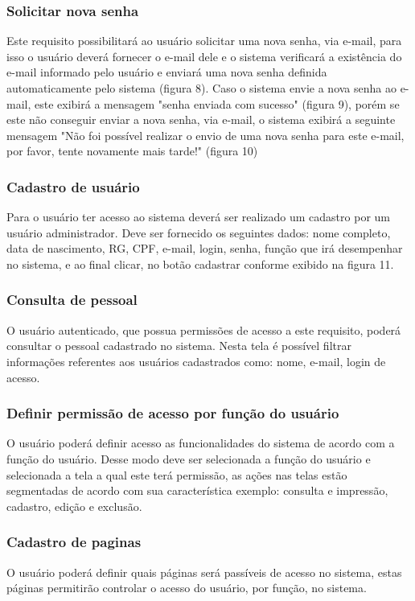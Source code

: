 \documentclass{acm_proc_article-sp}
\begin{document}
\subsubsection{Solicitar nova senha}
Este requisito possibilitará ao usuário solicitar uma nova senha, via e-mail, para isso o usuário deverá fornecer o e-mail dele e o sistema verificará a existência do e-mail informado pelo usuário e enviará uma nova senha definida automaticamente pelo sistema (figura 8). Caso o sistema envie a nova senha ao e-mail, este exibirá a mensagem "senha enviada com sucesso" (figura 9), porém se este não conseguir enviar a nova senha, via e-mail, o sistema exibirá a seguinte mensagem "Não foi possível realizar o envio de uma nova senha para este e-mail, por favor, tente novamente mais tarde!" (figura 10)

\subsubsection{Cadastro de usuário}
Para o usuário ter acesso ao sistema deverá ser realizado um cadastro por um usuário administrador. Deve ser fornecido os seguintes dados: nome completo, data de nascimento, RG, CPF, e-mail, login, senha, função que irá desempenhar no sistema, e ao final clicar, no botão cadastrar conforme exibido na figura 11.

\subsubsection{Consulta de pessoal}
O usuário autenticado, que possua permissões de acesso a este requisito, poderá consultar o pessoal cadastrado no sistema. Nesta tela é possível filtrar informações referentes aos usuários cadastrados como: nome, e-mail, login de acesso.   

\subsubsection{Definir permissão de acesso por função do usuário}
O usuário poderá definir acesso as funcionalidades do sistema de acordo com a função do usuário. Desse modo deve ser selecionada a função do usuário e selecionada a tela a qual este terá permissão, as ações nas telas estão segmentadas de acordo com sua característica exemplo: consulta e impressão, cadastro, edição e exclusão. 

\subsubsection{Cadastro de paginas}
O usuário poderá definir quais páginas será passíveis de acesso no sistema, estas páginas permitirão controlar o acesso do usuário, por função, no sistema.
\end{document}
